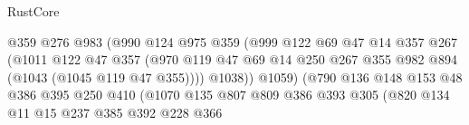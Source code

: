 \begin{lexlean}{RustCore}
\begin{coremodule}
                                      @359
                                      @276
                                      @983
                                      (@990
                                        @124
                                        @975
                                        @359
                                        (@999
                                          @122
                                          @69
                                          @47
                                          @14
                                          @357
                                          @267
                                          (@1011
                                            @122
                                            @47
                                            @357
                                            (@970
                                              @119
                                              @47
                                              @69
                                              @14
                                              @250
                                              @267
                                              @355
                                              @982
                                              @894
                                              (@1043 (@1045 @119 @47 @355))))
                                          @1038))
                                      @1059)
                                    (@790
                                      @136
                                      @148
                                      @153
                                      @48
                                      @386
                                      @395
                                      @250
                                      @410
                                      (@1070
                                        @135
                                        @807
                                        @809
                                        @386
                                        @393
                                        @305
                                        (@820
                                          @134
                                          @11
                                          @15
                                          @237
                                          @385
                                          @392
                                          @228
                                          @366

\end{coremodule}
\end{lexlean}

